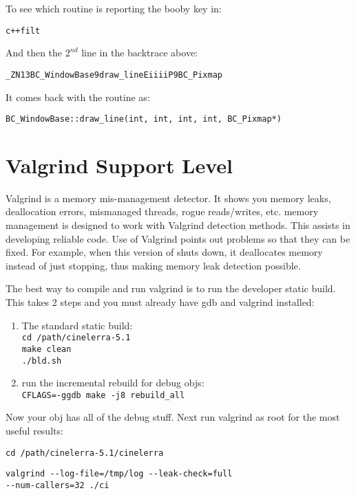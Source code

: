 To see which routine is reporting the booby key in:

\hspace{2em} \texttt{c++filt}

And then the $2^{nd}$ line in the backtrace above:

\hspace{2em}\texttt{\_ZN13BC\_WindowBase9draw\_lineEiiiiP9BC\_Pixmap}

It comes back with the routine as:

\hspace{2em}\texttt{BC\_WindowBase::draw\_line(int, int, int, int, BC\_Pixmap*)}

\section{Valgrind Support Level}
\label{sec:valgrind_support_level}

Valgrind is a memory mis-management detector.  It shows you memory leaks, deallocation errors, mismanaged threads, rogue reads/writes, etc.  \CGG{} memory management is designed to work with Valgrind detection methods.  This assists in developing reliable code.  Use of Valgrind points out problems so that they can be fixed.  For example, when this version of \CGG{} shuts down, it deallocates memory instead of just stopping, thus making memory leak detection possible.

The best way to compile and run valgrind is to run the developer static build. This takes 2 steps and you must already have gdb and valgrind installed:

\begin{enumerate}[nosep]
	\item The standard static build:\\
		\texttt{cd /path/cinelerra-5.1}\\
		\texttt{make clean}\\
		\texttt{./bld.sh}
	\item run the incremental rebuild for debug objs:\\
		\texttt{CFLAGS=-ggdb make -j8 rebuild\_all}
\end{enumerate}

Now your \CGG{} obj has all of the debug stuff. Next run valgrind as root for the most useful results:

\hspace{2em}\texttt{cd /path/cinelerra-5.1/cinelerra}

\hspace{2em}\texttt{valgrind -{}-log-file=/tmp/log -{}-leak-check=full\\
	-{}-num-callers=32 ./ci}

